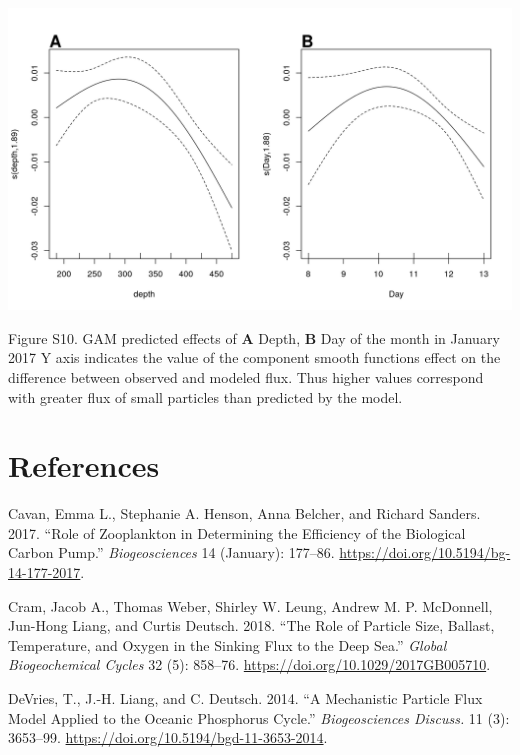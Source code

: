 \documentclass[]{article}
\begin{document}
\includegraphics{../figures/OSMSGamPlot.png}

Figure S10. GAM predicted effects of \textbf{A} Depth, \textbf{B} Day of
the month in January 2017 Y axis indicates the value of the component
smooth functions effect on the difference between observed and modeled
flux. Thus higher values correspond with greater flux of small particles
than predicted by the model.

\hypertarget{references}{%
\section*{References}\label{references}}

\hypertarget{refs}{}
\leavevmode\hypertarget{ref-cavanRoleZooplanktonDetermining2017}{}%
Cavan, Emma L., Stephanie A. Henson, Anna Belcher, and Richard Sanders.
2017. ``Role of Zooplankton in Determining the Efficiency of the
Biological Carbon Pump.'' \emph{Biogeosciences} 14 (January): 177--86.
\url{https://doi.org/10.5194/bg-14-177-2017}.

\leavevmode\hypertarget{ref-cramRoleParticleSize2018}{}%
Cram, Jacob A., Thomas Weber, Shirley W. Leung, Andrew M. P. McDonnell,
Jun-Hong Liang, and Curtis Deutsch. 2018. ``The Role of Particle Size,
Ballast, Temperature, and Oxygen in the Sinking Flux to the Deep Sea.''
\emph{Global Biogeochemical Cycles} 32 (5): 858--76.
\url{https://doi.org/10.1029/2017GB005710}.

\leavevmode\hypertarget{ref-devriesMechanisticParticleFlux2014}{}%
DeVries, T., J.-H. Liang, and C. Deutsch. 2014. ``A Mechanistic Particle
Flux Model Applied to the Oceanic Phosphorus Cycle.''
\emph{Biogeosciences Discuss.} 11 (3): 3653--99.
\url{https://doi.org/10.5194/bgd-11-3653-2014}.
\end{document}
